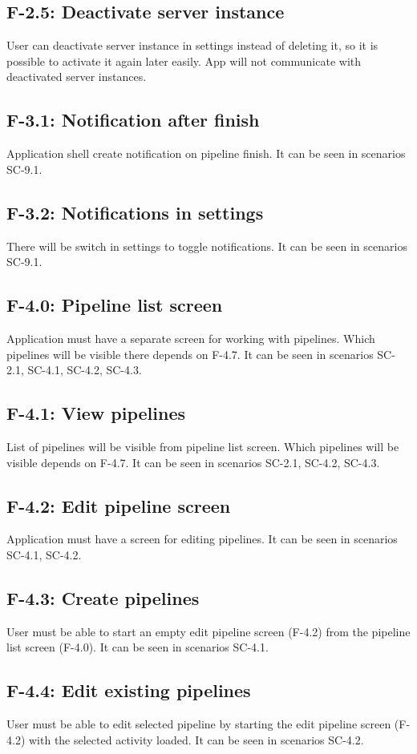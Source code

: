 \subsection*{F-2.5: Deactivate server instance}
User can deactivate server instance in settings instead of deleting it, so it is possible to activate it again later easily. App will not communicate with deactivated server instances.
\subsection*{F-3.1: Notification after finish}
Application shell create notification on pipeline finish. It can be seen in scenarios SC-9.1.
\subsection*{F-3.2: Notifications in settings}
There will be switch in settings to toggle notifications. It can be seen in scenarios SC-9.1.
\subsection*{F-4.0: Pipeline list screen}
Application must have a separate screen for working with pipelines. Which pipelines will be visible there depends on F-4.7. It can be seen in scenarios SC-2.1, SC-4.1, SC-4.2, SC-4.3.
\subsection*{F-4.1: View pipelines}
List of pipelines will be visible from pipeline list screen. Which pipelines will be visible depends on F-4.7. It can be seen in scenarios SC-2.1, SC-4.2, SC-4.3.
\subsection*{F-4.2: Edit pipeline screen}
Application must have a screen for editing pipelines. It can be seen in scenarios SC-4.1, SC-4.2.
\subsection*{F-4.3: Create pipelines}
User must be able to start an empty edit pipeline screen (F-4.2) from the pipeline list screen (F-4.0). It can be seen in scenarios SC-4.1.
\subsection*{F-4.4: Edit existing pipelines}
User must be able to edit selected pipeline by starting the edit pipeline screen (F-4.2) with the selected activity loaded. It can be seen in scenarios SC-4.2.
